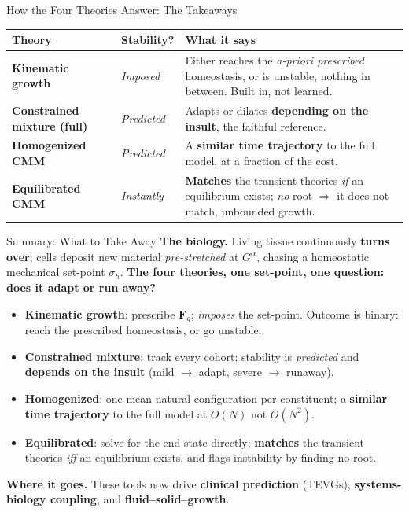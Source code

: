 \begin{frame}[t]{How the Four Theories Answer: The Takeaways}
  \small
  \begin{center}
  \renewcommand{\arraystretch}{1.5}
  \begin{tabular}{@{}p{}p{}p{}@{}}
    \toprule
    \textbf{Theory} & \textbf{Stability?} & \textbf{What it says} \\
    \midrule
    \textbf{\color{YaleBlue}Kinematic growth} & \emph{Imposed} &
      Either reaches the \emph{a-priori prescribed} homeostasis, or is unstable,
      nothing in between. Built in, not learned. \\
    \textbf{\color{YaleBlue}Constrained mixture (full)} & \emph{Predicted} &
      Adapts or dilates \textbf{depending on the insult}, the faithful
      reference. \\
    \textbf{\color{YaleBlue}Homogenized CMM} & \emph{Predicted} &
      A \textbf{similar time trajectory} to the full model, at a fraction of the
      cost. \\
    \textbf{\color{YaleBlue}Equilibrated CMM} & \emph{Instantly} &
      \textbf{Matches} the transient theories \emph{if} an equilibrium exists;
      \emph{no} root $\Rightarrow$ it does not match, unbounded growth. \\
    \bottomrule
  \end{tabular}
  \end{center}
\end{frame}

\begin{frame}[t]{Summary: What to Take Away}
  \textbf{The biology.} Living tissue continuously \textbf{turns over}; cells
  deposit new material \emph{pre-stretched} at $G^{\alpha}$, chasing a homeostatic
  mechanical set-point $\sigma_h$.
  \vfill
  \textbf{The four theories, one set-point, one question: does it adapt or run away?}
  \begin{itemize}\small\itemsep2pt
    \item \textbf{Kinematic growth}: prescribe $\bm{F}_g$; \emph{imposes} the
    set-point. Outcome is binary: reach the prescribed homeostasis, or go unstable.
    \item \textbf{Constrained mixture}: track every cohort; stability is
    \emph{predicted} and \textbf{depends on the insult} (mild $\to$ adapt, severe
    $\to$ runaway).
    \item \textbf{Homogenized}: one mean natural configuration per constituent;
    a \textbf{similar time trajectory} to the full model at $O(N)$ not $O(N^2)$.
    \item \textbf{Equilibrated}: solve for the end state directly; \textbf{matches}
    the transient theories \emph{iff} an equilibrium exists, and flags instability
    by finding no root.
  \end{itemize}
  \vfill
  \textbf{Where it goes.} These tools now drive \textbf{clinical prediction}
  (TEVGs), \textbf{systems-biology coupling}, and \textbf{fluid--solid--growth}.
\end{frame}

